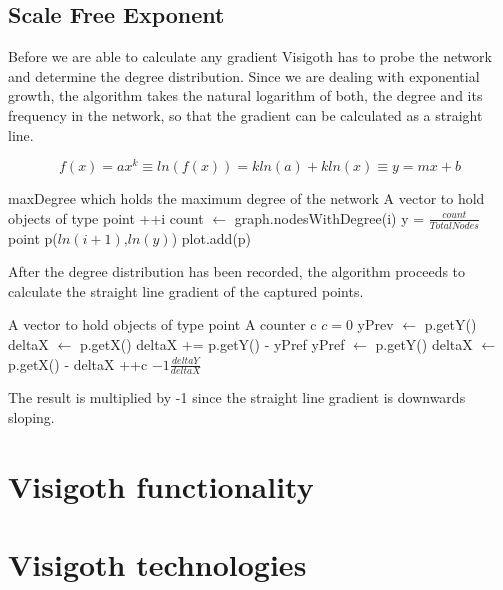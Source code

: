 \documentclass[a4paper,11pt,titlepage]{article}
\let\stdsection\section         %
\renewcommand{\section}{\newpage\stdsection}
\begin{document}
\subsection{Scale Free Exponent}

Before we are able to calculate any gradient Visigoth has to probe the network
and determine the degree distribution. Since we are dealing with exponential
growth, the algorithm takes the natural logarithm of both, the degree and its
frequency in the network, so that the gradient can be calculated as a straight
line.

\[
f(x) = ax^k \equiv ln(f(x)) = kln(a) + kln(x) \equiv y = mx + b
\]

\begin{algorithmic}
\REQUIRE maxDegree which holds the maximum degree of the network
\REQUIRE A vector to hold objects of type point
	\STATE ++i
	\STATE count $\gets$ graph.nodesWithDegree(i)
	\STATE y = $\frac{count}{Total Nodes}$
		\STATE  point p($ln(i+1)$,$ln(y)$)
		\STATE plot.add(p)
	\ENDIF
\ENDFOR
\end{algorithmic}

After the degree distribution has been recorded, the algorithm proceeds to
calculate the straight line gradient of the captured points.

\begin{algorithmic}
\REQUIRE A vector to hold objects of type point
\REQUIRE A counter c
\STATE $c = 0$
		\STATE yPrev $\gets$ p.getY()
		\STATE  deltaX $\gets$ p.getX()
	\ELSE
		\STATE deltaX += p.getY() - yPref
		\STATE yPref $\gets$ p.getY()
		\STATE deltaX $\gets$ p.getX() - deltaX
	\ENDIF
		\STATE ++c
\ENDFOR
\RETURN $-1\frac{deltaY}{deltaX}$
\end{algorithmic}

The result is multiplied by -1 since the straight line gradient is downwards
sloping.



\section{Visigoth functionality}




\section{Visigoth technologies}
\end{document}

